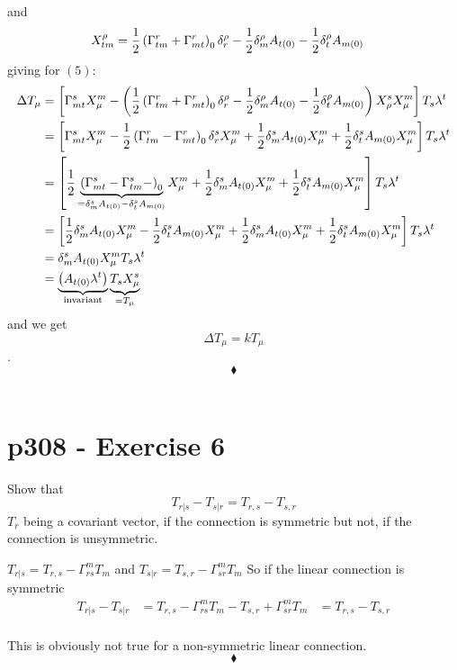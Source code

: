 and 
\begin{align}
X^{\rho}_{tm} &= \frac{1}{2}\left(\Gamma^r_{tm} +\Gamma^r_{mt}\right)_0\delta^{\rho}_r- \frac{1}{2} \delta^{\rho}_m A_{t(0)}- \frac{1}{2} \delta^{\rho}_t A_{m(0)}
\end{align}
giving for $(5)$:
\begin{align}
\Delta T_{\mu} &= \left[ \Gamma^s_{mt}X^m_{\mu}- \left(\frac{1}{2}\left(\Gamma^r_{tm} +\Gamma^r_{mt}\right)_0\delta^{\rho}_r- \frac{1}{2} \delta^{\rho}_m A_{t(0)}- \frac{1}{2} \delta^{\rho}_t A_{m(0)}\right)X^s_{\rho}X^m_{\mu} \right]T_s\lambda^t\\
 &= \left[ \Gamma^s_{mt}X^m_{\mu}- \frac{1}{2}\left(\Gamma^r_{tm} -\Gamma^r_{mt}\right)_0\delta^{s}_rX^m_{\mu}+ \frac{1}{2} \delta^{s}_m A_{t(0)}X^m_{\mu}+ \frac{1}{2} \delta^{s}_t A_{m(0)}X^m_{\mu}\right]T_s\lambda^t\\
 &= \left[ \frac{1}{2}\underbrace{\left(\Gamma^s_{mt}-\Gamma^s_{tm} -\right)_0}_{=\delta^s_mA_{t(0)} - \delta^s_t A_{m(0)}}X^m_{\mu}+ \frac{1}{2} \delta^{s}_m A_{t(0)}X^m_{\mu}+ \frac{1}{2} \delta^{s}_t A_{m(0)}X^m_{\mu}\right]T_s\lambda^t\\
 &= \left[ \frac{1}{2}\delta^s_mA_{t(0)} X^m_{\mu}- \frac{1}{2}\delta^s_t A_{m(0)}X^m_{\mu}+ \frac{1}{2} \delta^{s}_m A_{t(0)}X^m_{\mu}+ \frac{1}{2} \delta^{s}_t A_{m(0)}X^m_{\mu}\right]T_s\lambda^t\\
 &=  \delta^s_mA_{t(0)} X^m_{\mu}T_s\lambda^t\\
 &= \underbrace{\left(A_{t(0)} \lambda^t\right)}_{\text{invariant}}\underbrace{T_sX^s_{\mu}}_{= T_{\mu}}
\end{align}
and we get $$\Delta T_{\mu}= kT_{\mu}$$.
$$\blacklozenge$$\\
\newpage



\section{p308 - Exercise 6}
\begin{tcolorbox}
Show that $$T_{r|s} - T_{s|r}= T_{r,s}-T_{s,r}$$
$T_r$ being a covariant vector, if the connection is symmetric but not, if the connection is unsymmetric.
\end{tcolorbox}
$T_{r|s} = T_{r,s}-\Gamma^m_{rs}T_m$ and $T_{s|r} = T_{s,r}-\Gamma^m_{sr}T_m$
So if the linear connection is symmetric
\begin{align}
T_{r|s} - T_{s|r}&= T_{r,s}-\Gamma^m_{rs}T_m-T_{s,r}+\Gamma^m_{sr}T_m
&= T_{r,s}-T_{s,r}
\end{align}\\
This is obviously not true for a non-symmetric linear connection.
$$\blacklozenge$$\\
\newpage

